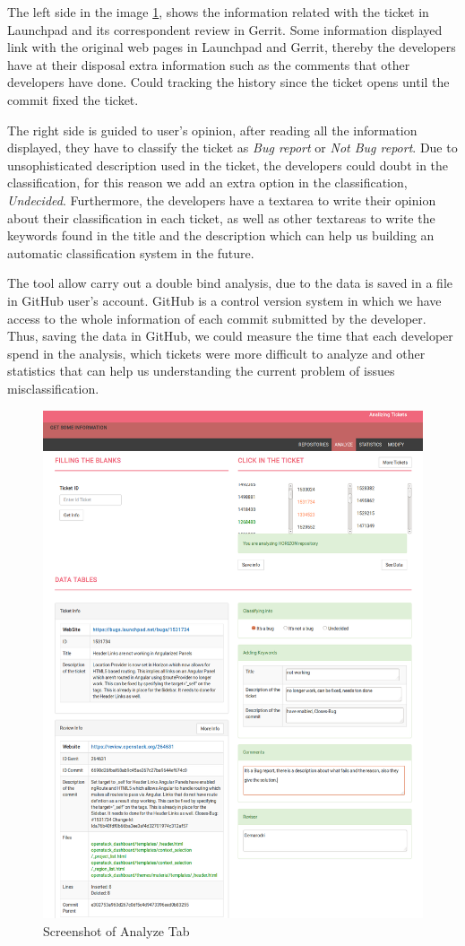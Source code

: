\documentclass[ifip]{svmult}
\begin{document}
The left side in the image \ref{fig:2}, shows the information related with the ticket in Launchpad and its correspondent review in Gerrit. Some information displayed link with the original web pages in Launchpad and Gerrit, thereby the developers have at their disposal extra information such as the comments that other developers have done. Could tracking the history since the ticket opens until the commit fixed the ticket.

The right side is guided to user's opinion, after reading all the information displayed, they have to classify the ticket as \textit{Bug report} or \textit{Not Bug report}. Due to unsophisticated description used in the ticket, the developers could doubt in the classification, for this reason we add an extra option in the classification, \textit{Undecided}. Furthermore, the developers have a textarea to write their opinion about their classification in each ticket, as well as other textareas to write the keywords found in the title and the description which can help us building an automatic classification system in the future.

The tool allow carry out a double bind analysis, due to the data is saved in a file in GitHub user's account. GitHub is a control version system in which we have access to the whole information of each commit submitted by the developer. Thus, saving the data in GitHub, we could measure the time that each developer spend in the analysis, which tickets were more difficult to analyze and other statistics that can help us understanding the current problem of issues misclassification.

\begin{figure}
\centering
\includegraphics[height=15cm]{index2.png}
\caption{Screenshot of Analyze Tab}
\label{fig:2}       %
\end{figure}
\end{document}
